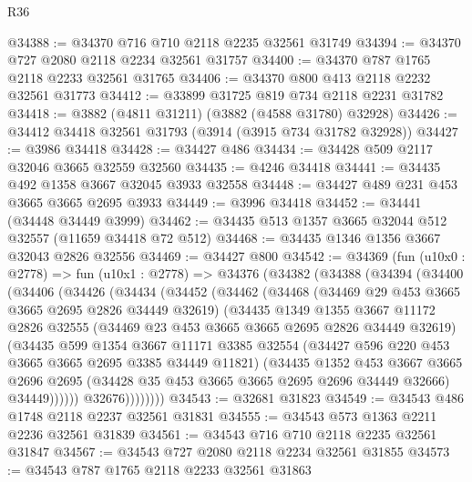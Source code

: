 \begin{lexlean}{R36}
\begin{coremodule}
@34388 := @34370 @716 @710 @2118 @2235 @32561 @31749
@34394 := @34370 @727 @2080 @2118 @2234 @32561 @31757
@34400 := @34370 @787 @1765 @2118 @2233 @32561 @31765
@34406 := @34370 @800 @413 @2118 @2232 @32561 @31773
@34412 := @33899 @31725 @819 @734 @2118 @2231 @31782
@34418 := @3882 (@4811 @31211) (@3882 (@4588 @31780) @32928)
@34426 := @34412 @34418 @32561 @31793 (@3914 (@3915 @734 @31782 @32928))
@34427 := @3986 @34418
@34428 := @34427 @486
@34434 := @34428 @509 @2117 @32046 @3665 @32559 @32560
@34435 := @4246 @34418
@34441 := @34435 @492 @1358 @3667 @32045 @3933 @32558
@34448 := @34427 @489 @231 @453 @3665 @3665 @2695 @3933
@34449 := @3996 @34418
@34452 := @34441 (@34448 @34449 @3999)
@34462 := @34435 @513 @1357 @3665 @32044 @512 @32557 (@11659 @34418 @72 @512)
@34468 := @34435 @1346 @1356 @3667 @32043 @2826 @32556
@34469 := @34427 @800
@34542 := @34369
    (fun (u10x0 : @2778) =>
    fun (u10x1 : @2778) =>
    @34376
      (@34382
        (@34388
          (@34394
            (@34400
              (@34406
                (@34426
                  (@34434
                    (@34452
                      (@34462
                        (@34468
                          (@34469 @29 @453 @3665 @3665 @2695 @2826 @34449 @32619)
                          (@34435
                            @1349
                            @1355
                            @3667
                            @11172
                            @2826
                            @32555
                            (@34469 @23 @453 @3665 @3665 @2695 @2826 @34449 @32619)
                            (@34435
                              @599
                              @1354
                              @3667
                              @11171
                              @3385
                              @32554
                              (@34427 @596 @220 @453 @3665 @3665 @2695 @3385 @34449 @11821)
                              (@34435
                                @1352
                                @453
                                @3667
                                @3665
                                @2696
                                @2695
                                (@34428 @35 @453 @3665 @3665 @2695 @2696 @34449 @32666)
                                @34449))))))
                    @32676))))))))
@34543 := @32681 @31823
@34549 := @34543 @486 @1748 @2118 @2237 @32561 @31831
@34555 := @34543 @573 @1363 @2211 @2236 @32561 @31839
@34561 := @34543 @716 @710 @2118 @2235 @32561 @31847
@34567 := @34543 @727 @2080 @2118 @2234 @32561 @31855
@34573 := @34543 @787 @1765 @2118 @2233 @32561 @31863

\end{coremodule}
\end{lexlean}
